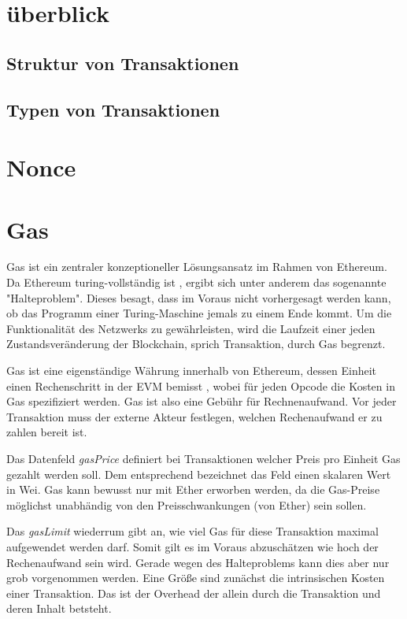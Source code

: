 \documentclass{llncs}
\begin{document}
\section{überblick}

\subsection{Struktur von Transaktionen}

\subsection{Typen von Transaktionen}

\section{Nonce}

\section{Gas}

Gas ist ein zentraler konzeptioneller Lösungsansatz im Rahmen von Ethereum. Da Ethereum turing-vollständig ist \cite[S. 1]{wood_ethereum/yellowpaper_2019}, ergibt sich unter anderem das sogenannte "Halteproblem". Dieses besagt, dass im Voraus nicht vorhergesagt werden kann, ob das Programm einer Turing-Maschine jemals zu einem Ende kommt. \cite[S.70]{davis_computability_2013} Um die Funktionalität des Netzwerks zu gewährleisten, wird die Laufzeit einer jeden Zustandsveränderung der Blockchain, sprich Transaktion, durch Gas begrenzt.

Gas ist eine eigenständige Währung innerhalb von Ethereum, dessen Einheit einen Rechenschritt in der EVM bemisst \cite[S. 9:3]{m.spain_oasics-tokeneconomics_2019}, wobei für jeden Opcode die Kosten in Gas spezifiziert werden. \cite[S. 25 ff.]{wood_ethereum/yellowpaper_2019} Gas ist also eine Gebühr für Rechnenaufwand. Vor jeder Transaktion muss der externe Akteur festlegen, welchen Rechenaufwand er zu zahlen bereit ist.

Das Datenfeld \textit{gasPrice} definiert bei Transaktionen welcher Preis pro Einheit Gas gezahlt werden soll. Dem entsprechend bezeichnet das Feld einen skalaren Wert in Wei. Gas kann bewusst nur mit Ether erworben werden, da die Gas-Preise möglichst unabhändig von den Preisschwankungen (von Ether) sein sollen. \cite[S. 7]{wood_ethereum/yellowpaper_2019}

Das \textit{gasLimit} wiederrum gibt an, wie viel Gas für diese Transaktion maximal aufgewendet werden darf. Somit gilt es im Voraus abzuschätzen wie hoch der Rechenaufwand sein wird. Gerade wegen des Halteproblems kann dies aber nur grob vorgenommen werden. Eine Größe sind zunächst die intrinsischen Kosten einer Transaktion. Das ist der Overhead der allein durch die Transaktion und deren Inhalt betsteht. 
\end{document}
